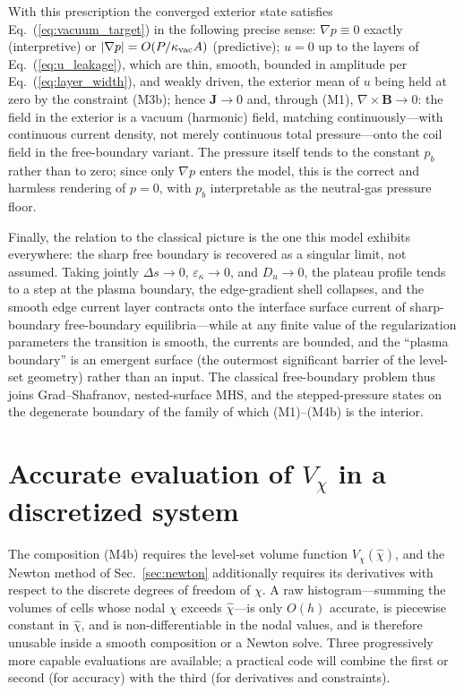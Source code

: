 \documentclass[english]{article}
\newcommand{\bB}{\mathbf{B}}
\newcommand{\bJ}{\mathbf{J}}
\begin{document}
With this prescription the converged exterior state satisfies Eq.~(\ref{eq:vacuum_target}) in the
following precise sense: $\nabla p\equiv0$ exactly (interpretive) or
$|\nabla p|=O(P/\kappa_{\rm vac}A)$ (predictive); $u=0$ up to the layers of
Eq.~(\ref{eq:u_leakage}), which are thin, smooth, bounded in amplitude per
Eq.~(\ref{eq:layer_width}), and weakly driven, the exterior mean of $u$ being held at zero by the
constraint (M3b); hence $\bJ\rightarrow0$ and, through (M1),
$\nabla\times\bB\rightarrow0$: the field in the exterior is a vacuum (harmonic) field, matching
continuously---with continuous current density, not merely continuous total pressure---onto the
coil field in the free-boundary variant. The pressure itself tends to the constant $p_b$ rather
than to zero; since only $\nabla p$ enters the model, this is the correct and harmless rendering
of $p=0$, with $p_b$ interpretable as the neutral-gas pressure floor.

Finally, the relation to the classical picture is the one this model exhibits everywhere: the
sharp free boundary is recovered as a singular limit, not assumed. Taking jointly
$\Delta s\rightarrow0$, $\varepsilon_\kappa\rightarrow0$, and $D_u\rightarrow0$, the plateau
profile tends to a step at the plasma boundary, the edge-gradient shell collapses, and the
smooth edge current layer contracts onto the interface surface current of sharp-boundary
free-boundary equilibria---while at any finite value of the regularization parameters the
transition is smooth, the currents are bounded, and the ``plasma boundary'' is an emergent
surface (the outermost significant barrier of the level-set geometry) rather than an input. The
classical free-boundary problem thus joins Grad--Shafranov, nested-surface MHS, and the
stepped-pressure states on the degenerate boundary of the family of which (M1)--(M4b) is the
interior.

\section{Accurate evaluation of $V_\chi$ in a discretized system}
\label{sec:Vchi}

The composition (M4b) requires the level-set volume function $V_\chi(\hat\chi)$, and the Newton
method of Sec.~\ref{sec:newton} additionally requires its derivatives with respect to the discrete
degrees of freedom of $\chi$. A raw histogram---summing the volumes of cells whose nodal $\chi$
exceeds $\hat\chi$---is only $O(h)$ accurate, is piecewise constant in $\hat\chi$, and is
non-differentiable in the nodal values, and is therefore unusable inside a smooth composition or a
Newton solve. Three progressively more capable evaluations are available; a practical code will
combine the first or second (for accuracy) with the third (for derivatives and constraints).
\end{document}
